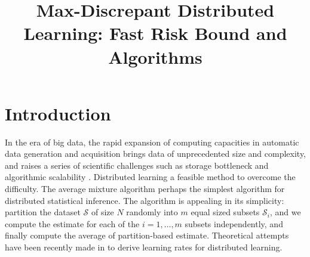 \documentclass{article}
\title{Max-Discrepant Distributed Learning: Fast Risk Bound and Algorithms}
\author{
}
\begin{document}

\maketitle

\begin{abstract}

\end{abstract}
\section{Introduction}
In the era of big data, the rapid expansion of computing capacities in automatic data generation
and acquisition brings data of unprecedented size and complexity, and raises a series
of scientific challenges such as storage bottleneck and algorithmic scalability \cite{zhou2014big,Zhang2013,lin2017distributed}.
Distributed learning a feasible method to overcome the difficulty.
The average mixture algorithm perhaps the simplest algorithm for distributed statistical inference.
The algorithm is appealing in its simplicity: partition the dataset $\mathcal{S}$ of size $N$ randomly into $m$ equal sized
subsets $\mathcal{S}_i$, and we compute the estimate for each of the $i=1,\ldots,m$ subsets independently,
and finally compute the average of partition-based estimate.
Theoretical attempts have been recently made in \cite{zhang2012communication,Zhang2013,lin2017distributed}
to derive learning rates for distributed learning.
\end{document}
